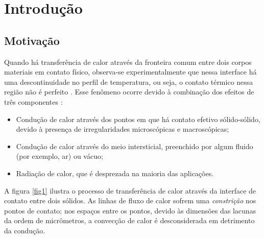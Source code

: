 \section{Introdução}

\subsection{Motivação}

Quando há transferência de calor através da fronteira comum entre dois corpos materiais em contato físico, observa-se experimentalmente que nessa interface há
uma descontinuidade no perfil de temperatura, ou seja, o contato térmico nessa região não é perfeito \citep{livro_ozisik}. 
Esse fenômeno ocorre devido à combinação dos efeitos de três componentes \citep{livro_madhusudana}:
\begin{itemize}
  \item Condução de calor através dos pontos em que há contato efetivo sólido-sólido, devido à presença de irregularidades microscópicas e macroscópicas;
  \item Condução de calor através do meio intersticial, preenchido por algum fluido (por exemplo, ar) ou vácuo;
  \item Radiação de calor, que é desprezada na maioria das aplicações. 
\end{itemize} 


% 

A figura \ref{fig1} ilustra o processo de transferência de calor através da interface de contato entre dois sólidos. As linhas de fluxo de calor
sofrem uma \textit{constrição} nos pontos de contato; nos espaços entre os pontos, devido às dimensões das lacunas da ordem de micrômetros, a convecção
de calor é desconsiderada em detrimento da condução.

